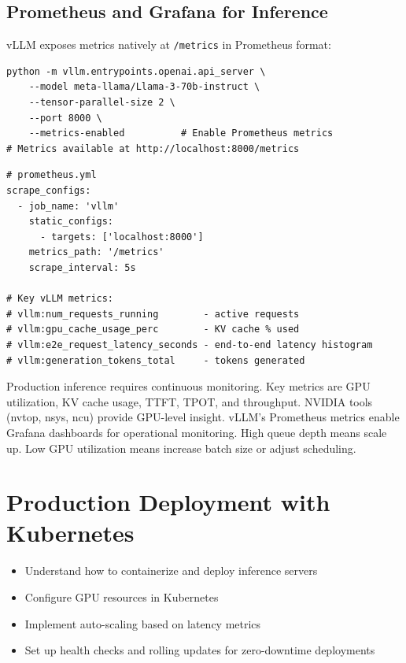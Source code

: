 \documentclass[10pt, oneside, openany]{book}
\newenvironment{learningobjectives}
  {\begin{tcolorbox}[enhanced, breakable,
    colback={rgb,255:red,232;green,240;blue,255},
    colframe=NavyBlue, boxrule=1.5pt, arc=4pt,
    title={\bfseries Learning Objectives},
    fonttitle=\bfseries\color{white},
    attach boxed title to top left={yshift=-2mm, xshift=5mm},
    boxed title style={colback=NavyBlue, arc=2pt}]
  \begin{itemize}[leftmargin=1.5em, itemsep=2pt]}
  {\end{itemize}\end{tcolorbox}}
\newenvironment{chapsummary}
  {\begin{tcolorbox}[enhanced, breakable,
    colback={rgb,255:red,245;green,245;blue,225},
    colframe=AccentOrange, boxrule=1.5pt, arc=4pt,
    title={\bfseries Chapter Summary},
    fonttitle=\bfseries\color{white},
    attach boxed title to top left={yshift=-2mm, xshift=5mm},
    boxed title style={colback=AccentOrange, arc=2pt}]}
  {\end{tcolorbox}}
\begin{document}
\section{Prometheus and Grafana for Inference}

vLLM exposes metrics natively at \texttt{/metrics} in Prometheus format:

\begin{lstlisting}[style=bashstyle, caption={Starting vLLM with metrics}]
python -m vllm.entrypoints.openai.api_server \
    --model meta-llama/Llama-3-70b-instruct \
    --tensor-parallel-size 2 \
    --port 8000 \
    --metrics-enabled          # Enable Prometheus metrics
# Metrics available at http://localhost:8000/metrics
\end{lstlisting}

\begin{lstlisting}[style=yamlstyle, caption={Prometheus scrape config for vLLM}]
# prometheus.yml
scrape_configs:
  - job_name: 'vllm'
    static_configs:
      - targets: ['localhost:8000']
    metrics_path: '/metrics'
    scrape_interval: 5s

# Key vLLM metrics:
# vllm:num_requests_running        - active requests
# vllm:gpu_cache_usage_perc        - KV cache % used
# vllm:e2e_request_latency_seconds - end-to-end latency histogram
# vllm:generation_tokens_total     - tokens generated
\end{lstlisting}

\begin{chapsummary}
Production inference requires continuous monitoring.  Key metrics are GPU
utilization, KV cache usage, TTFT, TPOT, and throughput.  NVIDIA tools (nvtop,
nsys, ncu) provide GPU-level insight.  vLLM's Prometheus metrics enable Grafana
dashboards for operational monitoring.  High queue depth means scale up.  Low GPU
utilization means increase batch size or adjust scheduling.
\end{chapsummary}

\chapter{Production Deployment with Kubernetes}
\label{ch:kubernetes}

\begin{learningobjectives}
  \item Understand how to containerize and deploy inference servers
  \item Configure GPU resources in Kubernetes
  \item Implement auto-scaling based on latency metrics
  \item Set up health checks and rolling updates for zero-downtime deployments
\end{learningobjectives}
\end{document}
